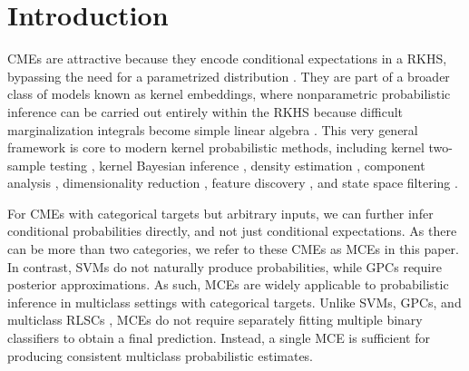 \documentclass[twoside]{article}
\begin{document}
	\section{Introduction}
	\label{sec:introduction}
	
		
		
		
		
		
		\Glspl{CME} are attractive because they encode conditional expectations in a \gls{RKHS}, bypassing the need for a parametrized distribution \citep{song2013kernel}. They are part of a broader class of models known as kernel embeddings, where nonparametric probabilistic inference can be carried out entirely within the \gls{RKHS} because difficult marginalization integrals become simple linear algebra \citep{muandet2016kernel}. This very general framework is core to modern kernel probabilistic methods, including kernel two-sample testing \citep{gretton2007kernel}, kernel Bayesian inference  \citep{fukumizu2013kernel}, density estimation \citep{song2008tailoring, kanagawa2014recovering}, component analysis \citep{muandet2013domain}, dimensionality reduction \citep{fukumizu2004dimensionality}, feature discovery \citep{jitkrittum2016interpretable}, and state space filtering \citep{kanagawa2016filtering}.
		
		
		For \glspl{CME} with categorical targets but arbitrary inputs, we can further infer conditional probabilities directly, and not just conditional expectations. As there can be more than two categories, we refer to these \glspl{CME} as \glspl{MCE} in this paper. In contrast, \glspl{SVM} \citep{scholkopf2002learning} do not naturally produce probabilities, while \glspl{GPC} \citep{rasmussen2006gaussian} require posterior approximations. As such, \glspl{MCE} are widely applicable to probabilistic inference in multiclass settings with categorical targets. Unlike \glspl{SVM}, \glspl{GPC}, and multiclass \glspl{RLSC} \citep{rifkin2003regularized, pahikkala2012unsupervised}, \glspl{MCE} do not require separately fitting multiple binary classifiers to obtain a final prediction. Instead, a single \gls{MCE} is sufficient for producing consistent multiclass probabilistic estimates.
		
\end{document}
